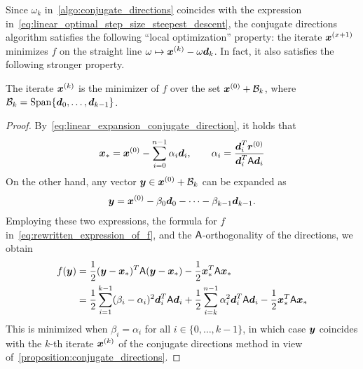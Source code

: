 Since $\omega_k$ in~\cref{algo:conjugate_directions} coincides with the expression in~\eqref{eq:linear_optimal_step_size_steepest_descent},
the conjugate directions algorithm satisfies the following ``local optimization'' property:
the iterate $\mathbf{\boldsymbol{x}}^{(x+1)}$ minimizes $f$ on the straight line $\omega \mapsto \mathbf{\boldsymbol{x}}^{(k)} - \omega \mathbf{\boldsymbol{d}}_k$.
In fact, it also satisfies the following stronger property.

\begin{proposition}
    \label{proposition:optimality_conjugate_directions}
    The iterate $\mathbf{\boldsymbol{x}}^{(k)}$ is the minimizer of $f$ over the set $\mathbf{\boldsymbol{x}}^{(0)} + \mathcal B_k$,
    where $\mathcal B_k = \operatorname{Span} \{\mathbf{\boldsymbol{d}}_0, \dotsc, \mathbf{\boldsymbol{d}}_{k-1} \}$.
\end{proposition}
\begin{proof}
    By~\eqref{eq:linear_expansion_conjugate_direction},
    it holds that
    \begin{equation*}
        \mathbf{\boldsymbol{x}}_* = \mathbf{\boldsymbol{x}}^{(0)} - \sum_{i=0}^{n-1} \alpha_i \mathbf{\boldsymbol{d}}_i,
        \qquad
        \alpha_i = \frac{\mathbf{\boldsymbol{d}}_i^T \mathbf{\boldsymbol{r}}^{(0)}}{\mathbf{\boldsymbol{d}}_i^T \mathsf A \mathbf{\boldsymbol{d}}_i}
    \end{equation*}
    On the other hand,
    any vector $\mathbf{\boldsymbol{y}} \in \mathbf{\boldsymbol{x}}^{(0)} + \mathcal B_k$ can be expanded as
    \[
        \mathbf{\boldsymbol{y}} = \mathbf{\boldsymbol{x}}^{(0)} - \beta_0 \mathbf{\boldsymbol{d}}_0 - \dotsb - \beta_{k-1} \mathbf{\boldsymbol{d}}_{k-1}.
    \]
    Employing these two expressions, the formula for $f$ in~\eqref{eq:rewritten_expression_of_f},
    and the $\mathsf A$-orthogonality of the directions,
    we obtain
    \begin{align*}
        f(\mathbf{\boldsymbol{y}})
        &= \frac{1}{2} (\mathbf{\boldsymbol{y}} - \mathbf{\boldsymbol{x}}_*)^T \mathsf A (\mathbf{\boldsymbol{y}} - \mathbf{\boldsymbol{x}}_*) - \frac{1}{2} \mathbf{\boldsymbol{x}}_*^T \mathsf A \mathbf{\boldsymbol{x}}_* \\
        &= \frac{1}{2} \sum_{i=1}^{k-1} (\beta_i - \alpha_i)^2 \mathbf{\boldsymbol{d}}_i^T \mathsf A \mathbf{\boldsymbol{d}}_i
        + \frac{1}{2} \sum_{i=k}^{n-1} \alpha_i^2 \mathbf{\boldsymbol{d}}_i^T \mathsf A \mathbf{\boldsymbol{d}}_i - \frac{1}{2} \mathbf{\boldsymbol{x}}_*^T \mathsf A \mathbf{\boldsymbol{x}}_*
    \end{align*}
    This is minimized when $\beta_i = \alpha_i$ for all $i \in \{0, \dotsc, k-1\}$,
    in which case $\mathbf{\boldsymbol{y}}$ coincides with the $k$-th iterate $\mathbf{\boldsymbol{x}}^{(k)}$ of the conjugate directions method in view of~\cref{proposition:conjugate_directions}.
\end{proof}
